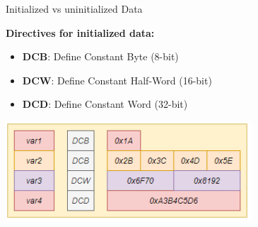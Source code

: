 \begin{concept}{Initialized vs uninitialized Data}
 
\begin{minipage}{0.75\linewidth}
\textbf{Directives for initialized data:}
\begin{itemize}
  \item \textbf{DCB}: Define Constant Byte (8-bit)
  \item \textbf{DCW}: Define Constant Half-Word (16-bit)
  \item \textbf{DCD}: Define Constant Word (32-bit)
\end{itemize}
\includegraphics[width=\linewidth]{images/init_data.png}


\end{minipage}
\end{concept}
